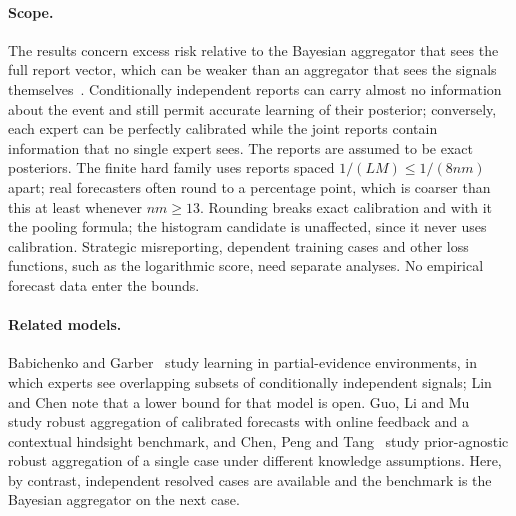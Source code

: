 \documentclass[11pt,a4paper]{article}
\theoremstyle{remark}
\begin{document}
\paragraph{Scope.} The results concern excess risk relative to the Bayesian aggregator that sees the full report vector, which can be weaker than an aggregator that sees the signals themselves~\cite{lc}. Conditionally independent reports can carry almost no information about the event and still permit accurate learning of their posterior; conversely, each expert can be perfectly calibrated while the joint reports contain information that no single expert sees. The reports are assumed to be exact posteriors. The finite hard family uses reports spaced $1/(LM)\le1/(8nm)$ apart; real forecasters often round to a percentage point, which is coarser than this at least whenever $nm\ge13$. Rounding breaks exact calibration and with it the pooling formula; the histogram candidate is unaffected, since it never uses calibration. Strategic misreporting, dependent training cases and other loss functions, such as the logarithmic score, need separate analyses. No empirical forecast data enter the bounds.

\paragraph{Related models.} Babichenko and Garber~\cite{bg} study learning in partial-evidence environments, in which experts see overlapping subsets of conditionally independent signals; Lin and Chen note that a lower bound for that model is open. Guo, Li and Mu~\cite{glm} study robust aggregation of calibrated forecasts with online feedback and a contextual hindsight benchmark, and Chen, Peng and Tang~\cite{cpt} study prior-agnostic robust aggregation of a single case under different knowledge assumptions. Here, by contrast, independent resolved cases are available and the benchmark is the Bayesian aggregator on the next case.
\end{document}
